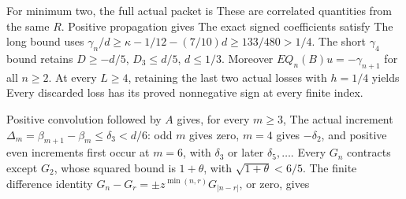 For minimum two, the full actual packet is
These are correlated quantities from the same \(R\). Positive propagation gives
The exact signed coefficients satisfy
The long bound uses \(\gamma_n/d\ge\kappa-1/12-(7/10)d\ge133/480>1/4\). The short \(\gamma_4\) bound retains \(D\ge-d/5\), \(D_3\le d/5\), \(d\le1/3\). Moreover \(EQ_n(B)u=-\gamma_{n+1}\) for all \(n\ge2\). At every \(L\ge4\), retaining the last two actual losses with \(h=1/4\) yields
Every discarded loss has its proved nonnegative sign at every finite index.

Positive convolution followed by \(A\) gives, for every \(m\ge3\),
The actual increment \(\Delta_m=\beta_{m+1}-\beta_m\le\delta_3<d/6\): odd \(m\) gives zero, \(m=4\) gives \(-\delta_2\), and positive even increments first occur at \(m=6\), with \(\delta_3\) or later \(\delta_5,\allowbreak \ldots\). Every \(G_n\) contracts except \(G_2\), whose squared bound is \(1+\theta\), with \(\sqrt{1+\theta}<6/5\). The finite difference identity \(G_n-G_r=\pm z^{\min(n,\allowbreak r)}G_{|n-r|}\), or zero, gives

